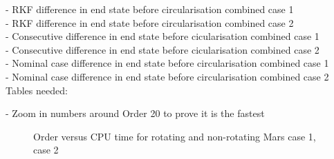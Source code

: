 - RKF difference in end state before circularisation combined case 1 \\ 
- RKF difference in end state before circularisation combined case 2 \\
- Consecutive difference in end state before cicularisation combined case 1 \\
- Consecutive difference in end state before cicularisation combined case 2 \\
- Nominal case difference in end state before circularisation combined case 1 \\
- Nominal case difference in end state before circularisation combined case 2 \\

Tables needed:

- Zoom in numbers around Order 20 to prove it is the fastest \\

\begin{figure}
\centering
{} 
\caption{Order versus CPU time for rotating and non-rotating Mars \protect{} case 1,  \protect{} case 2 } 
\label{fig:orderVsCPUcase1combined} 
\end{figure} 

